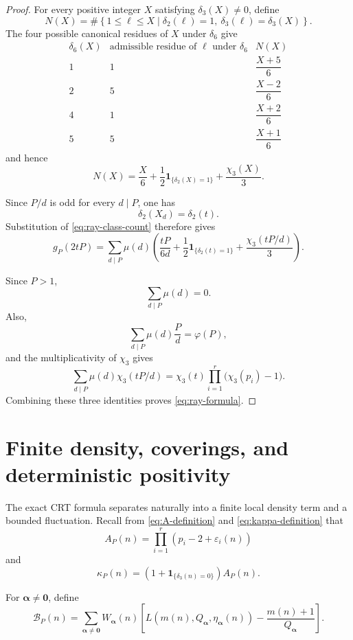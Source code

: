 \documentclass[12pt]{article}
\numberwithin{equation}{section}
\theoremstyle{definition}
\theoremstyle{remark}
\newcommand{\one}[1]{\mathbf 1_{\{#1\}}}
\newcommand{\Bcal}{\mathcal B}
\begin{document}
\begin{proof}
For every positive integer $X$ satisfying $\delta_3(X)\neq0$,
define
\[
N(X)
=
\#
\left\{
1\leq\ell\leq X
\mathrel{}\middle|\mathrel{}
\delta_2(\ell)=1,\
\delta_3(\ell)=\delta_3(X)
\right\}.
\]
The four possible canonical residues of $X$ under $\delta_6$
give
\[
\begin{array}{c|c|c}
\delta_6(X)
& \text{admissible residue of $\ell$ under $\delta_6$}
& N(X)\\
\hline
1 & 1 & \dfrac{X+5}{6}\\[4pt]
2 & 5 & \dfrac{X-2}{6}\\[4pt]
4 & 1 & \dfrac{X+2}{6}\\[4pt]
5 & 5 & \dfrac{X+1}{6}
\end{array}
\]
and hence
\begin{equation}
\label{eq:ray-class-count}
N(X)
=
\frac X6
+\frac12\one{\delta_2(X)=1}
+\frac{\chi_3(X)}3.
\end{equation}

Since $P/d$ is odd for every $d\mid P$, one has
\[
\delta_2(X_d)=\delta_2(t).
\]
Substitution of \eqref{eq:ray-class-count} therefore gives
\[
g_P(2tP)
=
\sum_{d\mid P}\mu(d)
\left(
\frac{tP}{6d}
+\frac12\one{\delta_2(t)=1}
+\frac{\chi_3(tP/d)}3
\right).
\]

Since $P>1$,
\[
\sum_{d\mid P}\mu(d)=0.
\]
Also,
\[
\sum_{d\mid P}\mu(d)\frac{P}{d}
=
\varphi(P),
\]
and the multiplicativity of $\chi_3$ gives
\[
\sum_{d\mid P}
\mu(d)\chi_3(tP/d)
=
\chi_3(t)
\prod_{i=1}^{r}
\bigl(\chi_3(p_i)-1\bigr).
\]
Combining these three identities proves
\eqref{eq:ray-formula}.
\end{proof}

\section{Finite density, coverings, and deterministic positivity}

The exact CRT formula separates naturally into a finite local
density term and a bounded fluctuation. Recall from
\eqref{eq:A-definition} and \eqref{eq:kappa-definition} that
\[
A_P(n)
=
\prod_{i=1}^{r}
\left(p_i-2+\varepsilon_i(n)\right)
\]
and
\[
\kappa_P(n)
=
\left(1+\one{\delta_3(n)=0}\right)A_P(n).
\]

For
$\boldsymbol\alpha\neq\boldsymbol0$, define
\begin{equation}
\label{eq:B-discrepancy}
\Bcal_P(n)
=
\sum_{\boldsymbol\alpha\neq\boldsymbol0}
W_{\boldsymbol\alpha}(n)
\left[
L\left(
m(n),
Q_{\boldsymbol\alpha},
\eta_{\boldsymbol\alpha}(n)
\right)
-
\frac{m(n)+1}{Q_{\boldsymbol\alpha}}
\right].
\end{equation}
\end{document}
